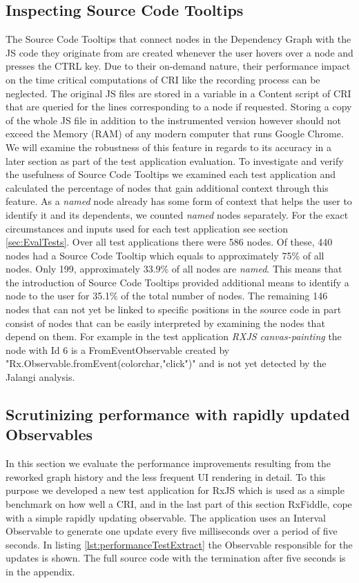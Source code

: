 	\subsection{Inspecting Source Code Tooltips}
	The Source Code Tooltips that connect nodes in the Dependency Graph with the JS code they originate from are created whenever the user hovers over a node and presses the CTRL key. Due to their on-demand nature, their performance impact on the time critical computations of CRI like the recording process can be neglected. The original JS files are stored in a variable in a Content script of CRI that are queried for the lines corresponding to a node if requested. Storing a copy of the whole JS file in addition to the instrumented version however should not exceed the Memory (RAM) of any modern computer that runs Google Chrome. We will examine the robustness of this feature in regards to its accuracy in a later section as part of the test application evaluation. To investigate and verify the usefulness of Source Code Tooltips we examined each test application and calculated the percentage of nodes that gain additional context through this feature. As a \emph{named} node already has some form of context that helps the user to identify it and its dependents, we counted \emph{named} nodes separately. For the exact circumstances and inputs used for each test application see section \ref{sec:EvalTests}. Over all test applications there were 586 nodes. Of these, 440 nodes had a Source Code Tooltip which equals to approximately 75\% of all nodes. Only 199, approximately 33.9\% of all nodes are \emph{named}. This means that the introduction of Source Code Tooltips provided additional means to identify a node to the user for 35.1\% of the total number of nodes. The remaining 146 nodes that can not yet be linked to specific positions in the source code in part consist of nodes that can be easily interpreted by examining the nodes that depend on them. For example in the test application \emph{RXJS canvas-painting}
	the node with Id 6 is a FromEventObservable created by "Rx.Observable.fromEvent(colorchar,"click")" and is not yet detected by the Jalangi analysis.

	\subsection{Scrutinizing performance with rapidly updated Observables}
	\label{sec:PerformanceEvaluation}
	In this section we evaluate the performance improvements resulting from the reworked graph history and the less frequent UI rendering in detail. To this purpose we developed a new test application for RxJS which is used as a simple benchmark on how well a CRI, and in the last part of this section RxFiddle, cope with a simple rapidly updating observable. The application uses an Interval Observable to generate one update every five milliseconds over a period of five seconds. In listing \ref{lst:performanceTestExtract} the Observable responsible for the updates is shown. The full source code with the termination after five seconds is in the appendix. %
	
